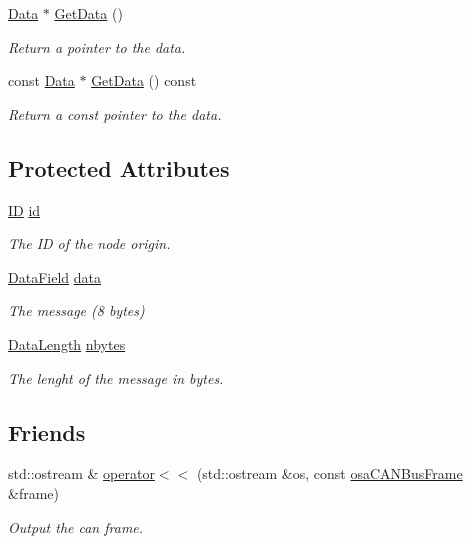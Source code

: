 \begin{DoxyCompactItemize}
\hyperlink{classosa_c_a_n_bus_frame_a938f540c9de33b240d3bc4f21c341ba5}{Data} $\ast$ \hyperlink{classosa_c_a_n_bus_frame_ac9a92b54cd93f9125c35bbfb4b1c0cc5}{Get\-Data} ()
\begin{DoxyCompactList}\small\item\em Return a pointer to the data. \end{DoxyCompactList}\item 
const \hyperlink{classosa_c_a_n_bus_frame_a938f540c9de33b240d3bc4f21c341ba5}{Data} $\ast$ \hyperlink{classosa_c_a_n_bus_frame_a43ef25ac96b0ecebadfa8fc3e5709353}{Get\-Data} () const 
\begin{DoxyCompactList}\small\item\em Return a const pointer to the data. \end{DoxyCompactList}\end{DoxyCompactItemize}
\subsection*{Protected Attributes}
\begin{DoxyCompactItemize}
\item 
\hyperlink{classosa_c_a_n_bus_frame_ae917bcfe6427b2055a405716909c6048}{I\-D} \hyperlink{classosa_c_a_n_bus_frame_a43c2a396a6f7dcf502daeb8f3cc8967e}{id}
\begin{DoxyCompactList}\small\item\em The I\-D of the node origin. \end{DoxyCompactList}\item 
\hyperlink{classosa_c_a_n_bus_frame_ac41162892eefb85a1308d485ec630969}{Data\-Field} \hyperlink{classosa_c_a_n_bus_frame_ae5114021468fe3ca35f95ec123db1e2d}{data}
\begin{DoxyCompactList}\small\item\em The message (8 bytes) \end{DoxyCompactList}\item 
\hyperlink{classosa_c_a_n_bus_frame_ab5bacbd4959a9046925438af889744f4}{Data\-Length} \hyperlink{classosa_c_a_n_bus_frame_abc694b0742e9c5b7e2db8640caa17565}{nbytes}
\begin{DoxyCompactList}\small\item\em The lenght of the message in bytes. \end{DoxyCompactList}\end{DoxyCompactItemize}
\subsection*{Friends}
\begin{DoxyCompactItemize}
\item 
std\-::ostream \& \hyperlink{classosa_c_a_n_bus_frame_ac61918af64d7f16800905a9fbb02d8a5}{operator$<$$<$} (std\-::ostream \&os, const \hyperlink{classosa_c_a_n_bus_frame}{osa\-C\-A\-N\-Bus\-Frame} \&frame)
\begin{DoxyCompactList}\small\item\em Output the can frame. \end{DoxyCompactList}\end{DoxyCompactItemize}


